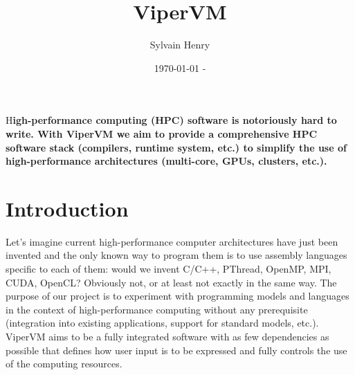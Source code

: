\documentclass[DIV=calc, paper=a4, fontsize=11pt, twocolumn]{scrartcl}	 %
\title{ViperVM} %
\author{Sylvain Henry} %
\date{\today{} - \currenttime}
\newcommand{\initial}[1]{ %
\lettrine[lines=3,lhang=0.3,nindent=0em]{
\color{DarkGoldenrod}
{\textsf{#1}}}{}}
\begin{document}
\maketitle %

\thispagestyle{fancy} %


\initial{H}\textbf{igh-performance computing (HPC) software is notoriously hard to
write. With ViperVM we aim to provide a comprehensive HPC software stack
(compilers, runtime system, etc.) to simplify the use of high-performance
architectures (multi-core, GPUs, clusters, etc.).
}


\section{Introduction}

Let's imagine current high-performance computer architectures have just been
invented and the only known way to program them is to use assembly languages
specific to each of them: would we invent C/C++, PThread, OpenMP, MPI, CUDA,
OpenCL? Obviously not, or at least not exactly in the same way. The purpose of
our project is to experiment with programming models and languages in the
context of high-performance computing without any prerequisite (integration into
existing applications, support for standard models, etc.). ViperVM aims to be a
fully integrated software with as few dependencies as possible that defines how
user input is to be expressed and fully controls the use of the computing
resources.
\end{document}
